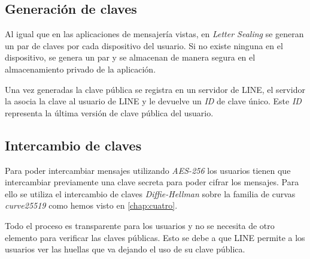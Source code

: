 \subsection{Generación de claves}
Al igual que en las aplicaciones de mensajería vistas, en \emph{Letter Sealing} se generan un par de claves por cada dispositivo del usuario. Si no existe ninguna en el dispositivo, se genera un par y se almacenan de manera segura en el almacenamiento privado de la aplicación.

Una vez generadas la clave pública se registra en un servidor de LINE, el servidor la asocia la clave al usuario de LINE y le devuelve un \emph{ID} de clave único. Este \emph{ID} representa la última versión de clave pública del usuario. 

\subsection{Intercambio de claves}
Para poder intercambiar mensajes utilizando \emph{AES-256} los usuarios tienen que intercambiar previamente una clave secreta para poder cifrar los mensajes. Para ello se utiliza el intercambio de claves \emph{Diffie-Hellman} sobre la familia de curvas \emph{curve25519} como hemos visto en \autoref{chap:cuatro}.

Todo el proceso es transparente para los usuarios y no se necesita de otro elemento para verificar las claves públicas. Esto se debe a que LINE permite a los usuarios ver las huellas que va dejando el uso de su clave pública.

